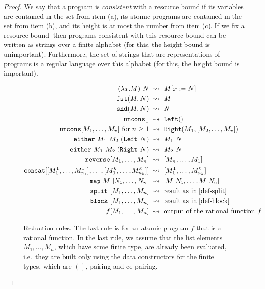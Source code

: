 \documentclass[a4paper,UKenglish,cleveref, autoref, thm-restate]{lipics-v2021}
\begin{document}
\begin{proof}
    \noindent
    We say that a program is \emph{consistent} with a resource bound if  its variables are contained in the set from item (a), its atomic programs are contained in the  set from item (b), and its  height is at most  the number from item (c). If we fix a resource bound, then programs consistent with this resource bound can be written as strings over a finite alphabet (for this, the height bound is unimportant). Furthermore, the set of strings that are representations of programs is a regular language over this alphabet (for this, the height bound is important). 
    

        \begin{figure}
         \begin{align*}
                    (\lambda x. M)\ N & \ \leadsto \ M[x:=N] \\
     \fstterm (M,N) & \ \leadsto \ M \\
     \sndterm (M,N) &  \ \leadsto  \  N \\
        \mathtt{uncons} []   & \ \leadsto  \ \leftterm ()  \\
        \mathtt{uncons} [M_1,\ldots,M_n] \text{ for $n \ge 1$} & \  \leadsto  \ \rightterm (M_1, [M_2,\ldots,M_n]) \\
        \casesterm \ M_1\  M_2\  (\leftterm\  N) &  \ \leadsto \  M_1\ N \\
        \casesterm \ M_1\  M_2\  (\rightterm\  N) & \  \leadsto  \ M_2\ N \\ 
        \reverseterm [M_1,\ldots,M_n]  & \ \leadsto \ [M_n, \ldots, M_1] \\
        \concatterm [[M^1_{1},\ldots,M^1_{n_1}],\ldots, [M^{k}_{1},\ldots,M^{k}_{n_k}]] & \ \leadsto \ [M^1_1,\ldots,M^k_{n_k}] \\ 
        \mapterm\  M\  [N_1,\ldots,N_n] & \ \leadsto \ [M\ N_1,\ldots,M\ N_n]\\
        \splitterm\ [M_1,\ldots, M_n] & \ \leadsto \ \text{result as in \eqref{def-split}} \\
        \blockterm\ [M_1,\ldots, M_n] & \ \leadsto \ \text{result as in \eqref{def-block}} \\
        f[M_1,\ldots,M_n] & \ \leadsto \ \text{output of the rational function $f$}    \end{align*}
    \caption{\label{fig:reduction-rules} Reduction rules. The last rule is for an atomic program $f$ that is a rational function. In the last rule, we assume that the list elements $M_1,\ldots,M_n$, which have some finite type, are already been evaluated, i.e.~they are built only using the data constructors for the finite types, which are $()$, pairing and co-pairing.
}
    \end{figure}



\end{proof}
\end{document}
